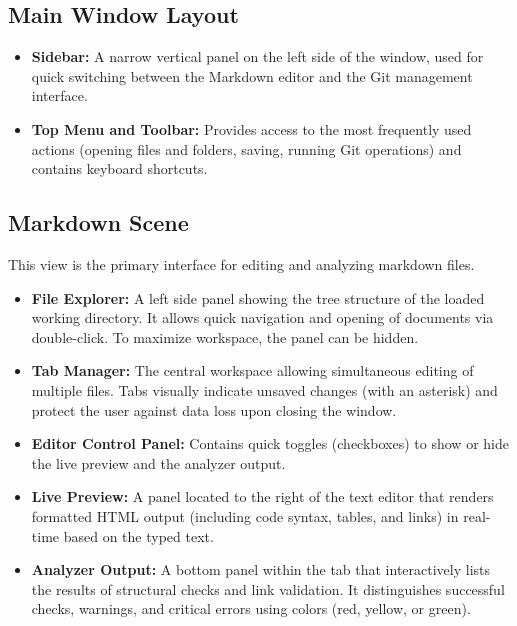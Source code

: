 \documentclass[12pt, a4paper]{article}
\begin{document}
\subsection{Main Window Layout}
\begin{itemize}
    \item \textbf{Sidebar:} A narrow vertical panel on the left side of the window, used for 
    quick switching between the Markdown editor and the Git management interface.
    \item \textbf{Top Menu and Toolbar:} Provides access to the most frequently used actions 
    (opening files and folders, saving, running Git operations) and contains keyboard shortcuts.
\end{itemize}

\subsection{Markdown Scene}
This view is the primary interface for editing and analyzing markdown files.
\begin{itemize}
    \item \textbf{File Explorer:} A left side panel showing the tree structure of the loaded working directory. 
    It allows quick navigation and opening of documents via double-click. To maximize workspace, the panel can be hidden.
    \item \textbf{Tab Manager:} The central workspace allowing simultaneous editing of multiple files. 
    Tabs visually indicate unsaved changes (with an asterisk) and protect the user against data loss upon closing the window.
    \item \textbf{Editor Control Panel:} Contains quick toggles (checkboxes) to show or hide the live 
    preview and the analyzer output.
    \item \textbf{Live Preview:} A panel located to the right of the text editor that renders formatted 
    HTML output (including code syntax, tables, and links) in real-time based on the typed text.
    \item \textbf{Analyzer Output:} A bottom panel within the tab that interactively lists the results of 
    structural checks and link validation. It distinguishes successful checks, warnings, and critical 
    errors using colors (red, yellow, or green).
\end{itemize}
\end{document}
